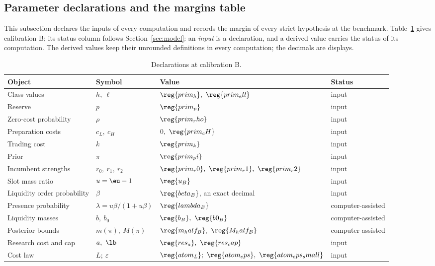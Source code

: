 \subsection{Parameter declarations and the margins table}\label{app:parameters}

This subsection declares the inputs of every computation and records the margin of every strict hypothesis at the
benchmark. Table~\ref{tab:a9-declarations} gives calibration B; its status column follows Section~\ref{sec:model}:
an \emph{input} is a declaration, and a derived value carries the status of its computation. The derived values keep
their unrounded definitions in every computation; the decimals are displays.

\begin{table}[ht]
\centering
\caption{Declarations at calibration B.}\label{tab:a9-declarations}
\footnotesize
\begin{tabular}{@{}llll@{}}
\toprule
Object & Symbol & Value & Status\\
\midrule
Class values & \(h,\ \ell\) & \(\reg{prim_h},\ \reg{prim_ell}\) & input\\
Reserve & \(p\) & \(\reg{prim_p}\) & input\\
Zero-cost probability & \(\rho\) & \(\reg{prim_rho}\) & input\\
Preparation costs & \(c_L,\ c_H\) & \(0,\ \reg{prim_cH}\) & input\\
Trading cost & \(k\) & \(\reg{prim_k}\) & input\\
Prior & \(\pi\) & \(\reg{prim_pi}\) & input\\
Incumbent strengths & \(r_0,\ r_1,\ r_2\) & \(\reg{prim_r0},\ \reg{prim_r1},\ \reg{prim_r2}\) & input\\
Slot mass ratio & \(u=\eu-1\) & \(\reg{u_B}\) & input\\
Liquidity order probability & \(\beta\) & \(\reg{beta_B}\), an exact decimal & input\\
Presence probability & \(\lambda=u\beta/(1+u\beta)\) & \(\reg{lambda_B}\) & computer-assisted\\
Liquidity masses & \(b,\ b_0\) & \(\reg{b_B},\ \reg{b0_B}\) & computer-assisted\\
Posterior bounds & \(m(\pi),\ M(\pi)\) & \(\reg{m_half_B},\ \reg{M_half_B}\) & computer-assisted\\
\midrule
Research cost and cap & \(a,\ \lb\) & \(\reg{res_a},\ \reg{res_cap}\) & input\\
Cost law & \(L;\ \varepsilon\) & \(\reg{atom_L};\ \reg{atom_eps},\ \reg{atom_eps_small}\) & input\\

\end{tabular}
\end{table}
